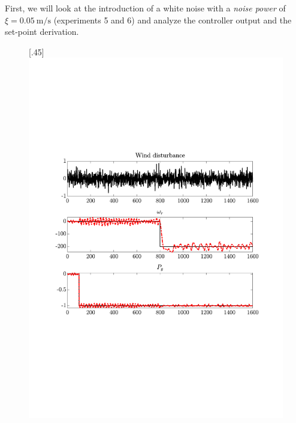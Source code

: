 First, we will look at the introduction of a white noise with a \textit{noise power} of $\xi= \SI{0.05}{\metre\per\second}$ (experiments 5 and 6) and analyze the controller output and the set-point derivation.

\begin{figure}[H]
    \centering

    [.45\textwidth]{\includegraphics[width=1\linewidth, scale=1, trim=60 230 55 150,clip]{fig/Open_loop/exp_5_ref.pdf}}
%

\end{figure}
